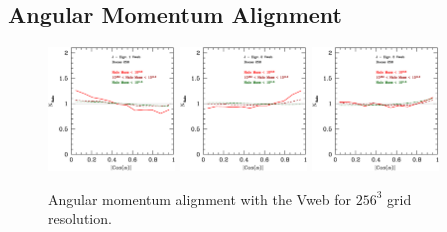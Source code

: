 \documentclass[usenatbib]{mn2e}
\begin{document}
\newpage
\subsection{Angular Momentum Alignment}

\begin{figure}
\includegraphics[width=0.30\textwidth]{../plot2/J/256_J_V1.ps}
\includegraphics[width=0.30\textwidth]{../plot2/J/256_J_V2.ps}
\includegraphics[width=0.30\textwidth]{../plot2/J/256_J_V3.ps}
\caption{Angular momentum alignment with the Vweb for $256^3$ grid resolution.}
\end{figure}
\end{document}
